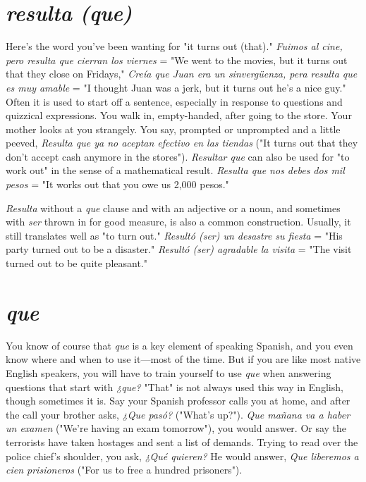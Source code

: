 \section{\emph{resulta (que)}}

Here's the word you've been wanting for "it turns out (that)."
\emph{Fuimos al cine, pero resulta que cierran los viernes} = "We went to
the movies, but it turns out that they close on Fridays," \emph{Creía que
Juan era un sinvergüenza, pera resulta que es muy amable} = "I
thought Juan was a jerk, but it turns out he's a nice guy." Often it is
used to start off a sentence, especially in response to questions and
quizzical expressions. You walk in, empty-handed, after going to the
store. Your mother looks at you strangely. You say, prompted or unprompted and a little peeved, \emph{Resulta que ya no aceptan efectivo en
las tiendas} ("It turns out that they don't accept cash anymore in the
stores"). \emph{Resultar que} can also be used for "to work out" in the sense
of a mathematical result. \emph{Resulta que nos debes dos mil pesos} = "It
works out that you owe us 2,000 pesos."

\emph{Resulta} without a \emph{que} clause and with an adjective or a noun,
and sometimes with \emph{ser} thrown in for good measure, is also a common
construction. Usually, it still translates well as "to turn out." \emph{Resultó
(ser) un desastre su fiesta} = "His party turned out to be a disaster."
\emph{Resultó (ser) agradable la visita} = "The visit turned out to be quite
pleasant."

\section{\emph{que}}

You know of course that \emph{que} is a key element of speaking
Spanish, and you even know where and when to use it---most of the
time. But if you are like most native English speakers, you will have
to train yourself to use \emph{que} when answering questions that start with
\emph{¿que?} "That" is not always used this way in English, though sometimes it is. Say your Spanish professor calls you at home, and after the
call your brother asks, \emph{¿Que pasó?} ("What's up?"). \emph{Que mañana va a
haber un examen} ("We're having an exam tomorrow"), you would answer. Or say the terrorists have taken hostages and sent a list of demands. Trying to read over the police chief's shoulder, you ask, \emph{¿Qué
quieren?} He would answer, \emph{Que liberemos a cien prisioneros} ("For us
to free a hundred prisoners").

